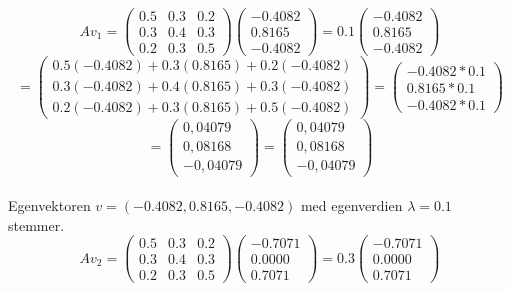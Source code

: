 \begin{equation}\nonumber
Av_1 = \begin{pmatrix}
    0.5 & 0.3 & 0.2 \\ 0.3 & 0.4 & 0.3 \\ 0.2 & 0.3 & 0.5
\end{pmatrix}\begin{pmatrix}
     -0.4082 \\ 0.8165 \\  -0.4082
\end{pmatrix} = 0.1 \begin{pmatrix}
     -0.4082 \\ 0.8165 \\  -0.4082
\end{pmatrix}
\end{equation}
\begin{equation}\nonumber
= \begin{pmatrix}
0.5(-0.4082)+0.3(0.8165)+0.2(-0.4082) \\ 0.3(-0.4082)+0.4(0.8165)+0.3(-0.4082) \\ 0.2(-0.4082)+0.3(0.8165)+0.5(-0.4082)
\end{pmatrix} = \begin{pmatrix}
     -0.4082*0.1 \\ 0.8165*0.1 \\  -0.4082*0.1
\end{pmatrix}
\end{equation}
\begin{equation}\nonumber
= \begin{pmatrix}
    0,04079 \\ 0,08168 \\ -0,04079
\end{pmatrix} = \begin{pmatrix}
     0,04079 \\ 0,08168 \\  -0,04079
\end{pmatrix}
\end{equation}
\vspace{0.1in}
\\ Egenvektoren $v=(-0.4082,0.8165,-0.4082)$ med egenverdien $\lambda = 0.1$ stemmer.
\vspace{0.1in}
\begin{equation}\nonumber
Av_2 = \begin{pmatrix}
    0.5 & 0.3 & 0.2 \\ 0.3 & 0.4 & 0.3 \\ 0.2 & 0.3 & 0.5
\end{pmatrix}\begin{pmatrix}
     -0.7071 \\ 0.0000 \\ 0.7071
\end{pmatrix} = 0.3 \begin{pmatrix}
     -0.7071 \\ 0.0000 \\ 0.7071
\end{pmatrix}
\end{equation}
